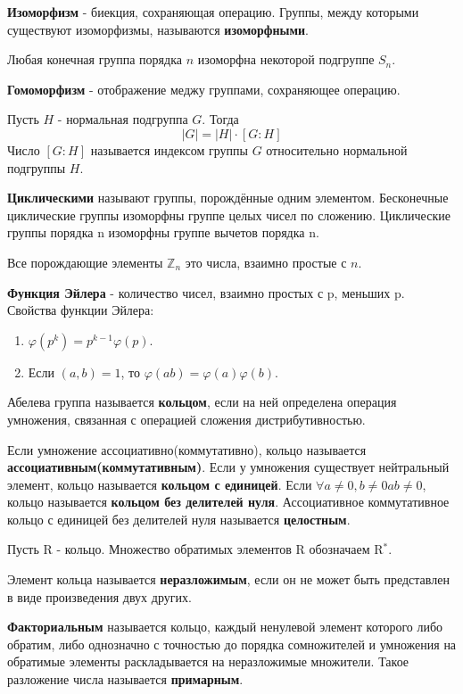 \documentclass[11pt]{article}
\newcounter{th}\setcounter{th}{0}
\def\th{\par\smallskip\refstepcounter{th}\textbf{\arabic{th}}}
\newtheorem*{Theorem}{Теорема \th}
\begin{document}
\textbf{Изоморфизм} - биекция, сохраняющая операцию. Группы, между которыми существуют изоморфизмы,
называются \textbf{изоморфными}.

\begin{Theorem}
Любая конечная группа порядка $n$ изоморфна некоторой подгруппе $S_n$.
\end{Theorem}

\textbf{Гомоморфизм} - отображение меджу группами, сохраняющее операцию.

\begin{Theorem}
Пусть $H$ - нормальная подгруппа $G$. Тогда
$$|G| = |H| \cdot [G: H]$$
Число $[G: H]$ называется индексом группы $G$ относительно нормальной подгруппы $H$.
\end{Theorem}

\textbf{Циклическими} называют группы, порождённые одним элементом. Бесконечные циклические группы изоморфны
группе целых чисел по сложению. Циклические группы порядка n изоморфны группе вычетов порядка n.

Все порождающие элементы \(\mathbb{Z}_n\) это числа, взаимно простые с \(n\).

\textbf{Функция Эйлера} - количество чисел, взаимно простых с p, меньших p.
Свойства функции Эйлера:
\begin{enumerate}
\item \(\varphi(p^k) = p^{k - 1}\varphi(p)\).
\item Если \((a, b) = 1\), то \(\varphi(ab) = \varphi(a)\varphi(b)\).
\end{enumerate}

Абелева группа называется \textbf{кольцом}, если на ней определена операция умножения, связанная
с операцией сложения дистрибутивностью.

Если умножение ассоциативно(коммутативно), кольцо называется \textbf{ассоциативным(коммутативным)}.
Если у умножения существует нейтральный элемент, кольцо называется \textbf{кольцом с единицей}.
Если \(\forall a \neq 0, b \neq 0 ab \neq 0\), кольцо называется \textbf{кольцом без делителей нуля}.
Ассоциативное коммутативное кольцо с единицей без делителей нуля называется \textbf{целостным}.

Пусть R - кольцо.
Множество обратимых элементов R обозначаем R\(^{\text{*}}\).

Элемент кольца называется \textbf{неразложимым}, если он не может быть представлен в виде произведения двух других.

\textbf{Факториальным} называется кольцо, каждый ненулевой элемент которого либо обратим, либо однозначно
с точностью до порядка сомножителей и умножения на обратимые элементы раскладывается на неразложимые
множители. Такое разложение числа называется \textbf{примарным}.
\end{document}

